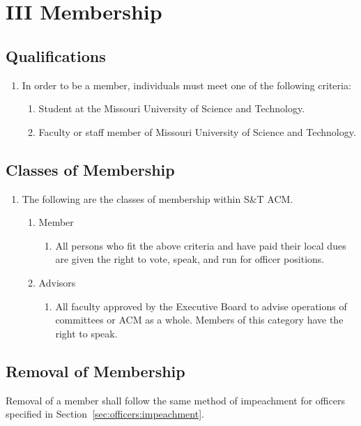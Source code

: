 \section{III \textendash{} Membership}
\subsection{Qualifications}
\begin{enumerate}[label=\alph*.]
  \item In order to be a member, individuals must meet one of the following
    criteria:
    \begin{enumerate}[label=\arabic*.]
      \item Student at the Missouri University of Science and Technology.
      \item Faculty or staff member of Missouri University of Science and
        Technology.
    \end{enumerate}
\end{enumerate}

\subsection{Classes of Membership}\label{sec:membership:classes}
\begin{enumerate}[label=\arabic*.]
  \item The following are the classes of membership within S\&T ACM.
    \begin{enumerate}[label=\alph*.,ref={\thesubsection.\theenumi\theenumii}]
      \item Member\label{sec:membership:classes:member}
        \begin{enumerate}[label=\arabic*.]
          \item All persons who fit the above criteria and have paid their
            local dues are given the right to vote, speak, and run for
            officer positions.
        \end{enumerate}
      \item Advisors
        \begin{enumerate}[label=\alph*.]
          \item All faculty approved by the Executive Board to advise
            operations of committees or ACM as a whole. Members of this
            category have the right to speak.
        \end{enumerate}
    \end{enumerate}
\end{enumerate}

\subsection{Removal of Membership}
Removal of a member shall follow the same method of impeachment for officers
specified in Section~\ref{sec:officers:impeachment}.
